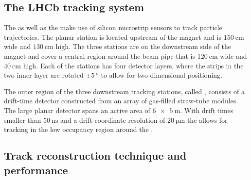 \subsection{The \acs*{LHCb} tracking system}
\label{sec:lhcb_experiment:tracking:ttit}
\label{sec:lhcb_experiment:tracking:ot}

The \TT as well as the \IT make use of silicon microstrip sensors to track
particle trajectories. The planar \TT station is located upstream of the magnet
and is $\SI{150}{\centi\metre}$ wide and $\SI{130}{\centi\metre}$ high. The
three \IT stations are on the downstream side of the magnet and cover a central
region around the beam pipe that is $\SI{120}{\centi\metre}$ wide and
$\SI{40}{\centi\metre}$ high. Each of the stations has four detector layers,
where the strips in the two inner layer are rotated $\pm\SI{5}{\degree}$ to
allow for two dimensional positioning.

The outer region of the three downstream tracking stations, called \OT, consists
of a drift-time detector constructed from an array of gas-filled straw-tube
modules. The large planar detector spans an active area of $\SI[product-units =
power]{6 x 5}{\metre}$. With drift times smaller than $\SI{50}{\nano\second}$
and a drift-coordinate resolution of $\SI{20}{\micro\metre}$ the \OT allows for
tracking in the low occupancy region around the \IT.

\subsection{Track reconstruction technique and performance}
\label{sec:lhcb_experiment:tracking:techniques_and_performance}

